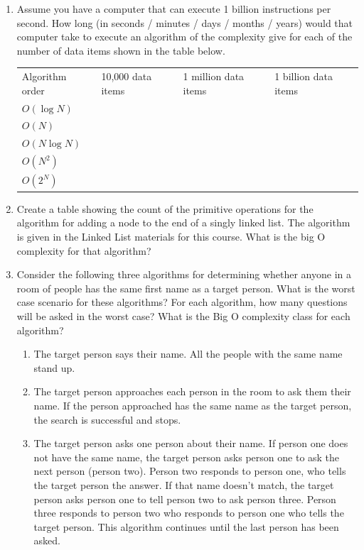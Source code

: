 \documentclass{article}
\begin{document}
\begin{enumerate}
	\item Assume you have a computer that can execute 1 billion instructions per second. How long (in seconds / minutes / days / months / years) would that computer take to execute an algorithm of the complexity give for each of the number of data items shown in the table below. \\
		\begin{center}
			\renewcommand{\arraystretch}{1.25}
			\begin{tabular} { | l | l | l | l |}
				\hline
				Algorithm order & 10,000 data items & 1 million data items & 1 billion data items \\
				\hhline{|=|=|=|=|}
				\(O(\log N)\) & & & \\ \hline
				\(O(N)\) & & & \\ \hline
				\(O(N \log N)\) & & & \\ \hline
				\(O(N^{2})\) & & & \\ \hline
				\(O(2^{N})\) & & & \\ \hline
			\end{tabular}
		\end{center}
	\vspace{2mm}
	\item Create a table showing the count of the primitive operations for the algorithm for adding a node to the end of a singly linked list. The algorithm is given in the Linked List materials for this course. What is the big O complexity for that algorithm?
	\vspace{4cm}
	\item Consider the following three algorithms for determining whether anyone in a room of people has the same first name as a target person. What is the worst case scenario for these algorithms? For each algorithm, how many questions will be asked in the worst case? What is the Big O complexity class for each algorithm?
		\begin{enumerate}[label=\arabic*.]
			\item The target person says their name. All the people with the same name stand up.
			\vspace{2cm}
			\item The target person approaches each person in the room to ask them their name. If the person approached has the same name as the target person, the search is successful and stops.
			\vspace{2cm}
			\item The target person asks one person about their name. If person one does not have the same name, the target person asks person one to ask the next person (person two). Person two responds to person one, who tells the target person the answer. If that name doesn’t match, the target person asks person one to tell person two to ask person three. Person three responds to person two who responds to person one who tells the target person. This algorithm continues until the last person has been asked.

\end{enumerate}
\end{enumerate}
\end{document}
